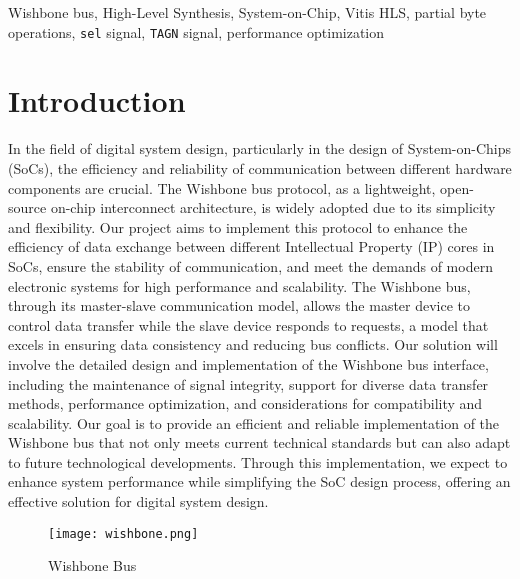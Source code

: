 \documentclass[conference]{IEEEtran}
\begin{document}
\begin{IEEEkeywords}
Wishbone bus, High-Level Synthesis, System-on-Chip, Vitis HLS, partial byte operations, \texttt{sel} signal, \texttt{TAGN} signal, performance optimization
\end{IEEEkeywords}

\section{Introduction}
In the field of digital system design, particularly in the design of System-on-Chips (SoCs), the efficiency and reliability of communication between different hardware components are crucial. The Wishbone bus protocol, as a lightweight, open-source on-chip interconnect architecture, is widely adopted due to its simplicity and flexibility. Our project aims to implement this protocol to enhance the efficiency of data exchange between different Intellectual Property (IP) cores in SoCs, ensure the stability of communication, and meet the demands of modern electronic systems for high performance and scalability. The Wishbone bus, through its master-slave communication model, allows the master device to control data transfer while the slave device responds to requests, a model that excels in ensuring data consistency and reducing bus conflicts. Our solution will involve the detailed design and implementation of the Wishbone bus interface, including the maintenance of signal integrity, support for diverse data transfer methods, performance optimization, and considerations for compatibility and scalability. Our goal is to provide an efficient and reliable implementation of the Wishbone bus that not only meets current technical standards but can also adapt to future technological developments. Through this implementation, we expect to enhance system performance while simplifying the SoC design process, offering an effective solution for digital system design.\cite{Sharma_2012}



\begin{figure}[h]
    \centering
    \texttt{[image: wishbone.png]}
    \caption{Wishbone Bus}
    \label{wishbone}
\end{figure}
\end{document}
